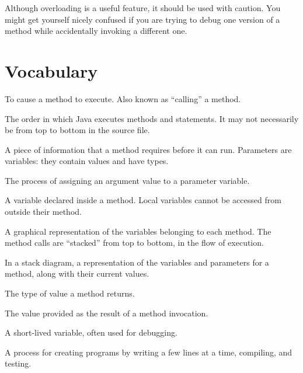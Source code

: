 Although overloading is a useful feature, it should be used with caution.
You might get yourself nicely confused if you are trying to debug one version of a method while accidentally invoking a different one.


\section{Vocabulary}

\begin{description}


To cause a method to execute.
Also known as ``calling'' a method.

The order in which Java executes methods and statements.
It may not necessarily be from top to bottom in the source file.

A piece of information that a method requires before it can run.
Parameters are variables: they contain values and have types.

The process of assigning an argument value to a parameter variable.

A variable declared inside a method.
Local variables cannot be accessed from outside their method.

A graphical representation of the variables belonging to each method.
The method calls are ``stacked'' from top to bottom, in the flow of execution.

In a stack diagram, a representation of the variables and parameters for a method, along with their current values.


The type of value a method returns.

The value provided as the result of a method invocation.

A short-lived variable, often used for debugging.


A process for creating programs by writing a few lines at a time, compiling, and testing.


\end{description}
